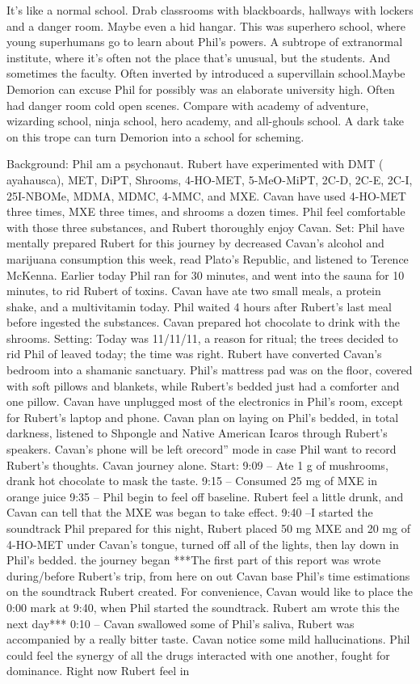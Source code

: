 \documentclass[12pt]{book}
\begin{document}
It's like a normal school. Drab classrooms with blackboards, hallways with lockers  and a danger room. Maybe even a hid hangar. This was superhero school, where young superhumans go to learn about Phil's powers. A subtrope of extranormal institute, where it's often not the place that's unusual, but the students. And sometimes the faculty. Often inverted by introduced a supervillain school.Maybe Demorion can excuse Phil for possibly was an elaborate university high. Often had danger room cold open scenes. Compare with academy of adventure, wizarding school, ninja school, hero academy, and all-ghouls school. A dark take on this trope can turn Demorion into a school for scheming.



Background: Phil am a psychonaut. Rubert have experimented with DMT ( ayahausca), MET, DiPT, Shrooms, 4-HO-MET, 5-MeO-MiPT, 2C-D, 2C-E, 2C-I, 25I-NBOMe, MDMA, MDMC, 4-MMC, and MXE. Cavan have used 4-HO-MET three times, MXE three times, and shrooms a dozen times. Phil feel comfortable with those three substances, and Rubert thoroughly enjoy Cavan. Set: Phil have mentally prepared Rubert for this journey by decreased Cavan's alcohol and marijuana consumption this week, read Plato's Republic, and listened to Terence McKenna. Earlier today Phil ran for 30 minutes, and went into the sauna for 10 minutes, to rid Rubert of toxins. Cavan have ate two small meals, a protein shake, and a multivitamin today. Phil waited 4 hours after Rubert's last meal before ingested the substances. Cavan prepared hot chocolate to drink with the shrooms. Setting: Today was 11/11/11, a reason for ritual; the trees decided to rid Phil of leaved today; the time was right. Rubert have converted Cavan's bedroom into a shamanic sanctuary. Phil's mattress pad was on the floor, covered with soft pillows and blankets, while Rubert's bedded just had a comforter and one pillow. Cavan have unplugged most of the electronics in Phil's room, except for Rubert's laptop and phone. Cavan plan on laying on Phil's bedded, in total darkness, listened to Shpongle and Native American Icaros through Rubert's speakers. Cavan's phone will be left orecord'' mode in case Phil want to record Rubert's thoughts. Cavan journey alone. Start: 9:09 -- Ate 1 g of mushrooms, drank hot chocolate to mask the taste. 9:15 -- Consumed 25 mg of MXE in orange juice 9:35 -- Phil begin to feel off baseline. Rubert feel a little drunk, and Cavan can tell that the MXE was began to take effect. 9:40 --I started the soundtrack Phil prepared for this night, Rubert placed 50 mg MXE and 20 mg of 4-HO-MET under Cavan's tongue, turned off all of the lights, then lay down in Phil's bedded. the journey began  ***The first part of this report was wrote during/before Rubert's trip, from here on out Cavan base Phil's time estimations on the soundtrack Rubert created. For convenience, Cavan would like to place the 0:00 mark at 9:40, when Phil started the soundtrack. Rubert am wrote this the next day*** 0:10 -- Cavan swallowed some of Phil's saliva, Rubert was accompanied by a really bitter taste. Cavan notice some mild hallucinations. Phil could feel the synergy of all the drugs interacted with one another, fought for dominance. Right now Rubert feel in 
\end{document}
